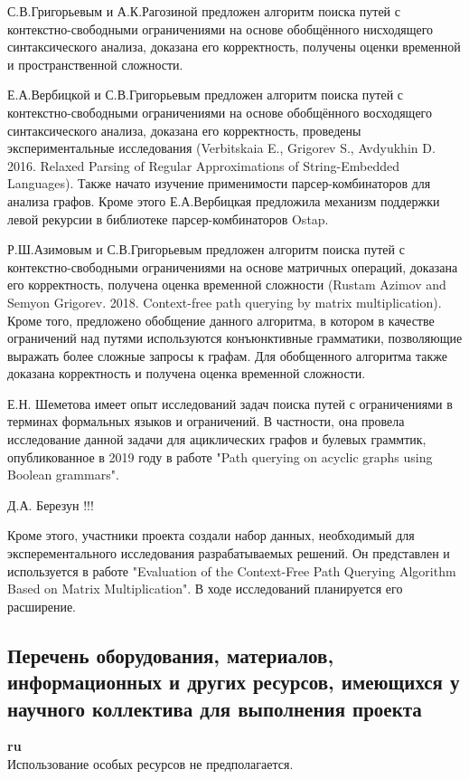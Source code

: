\documentclass[12pt]{article}  %
\theoremstyle{remark}
\begin{document}
С.В.Григорьевым и А.К.Рагозиной предложен алгоритм поиска путей с контекстно-свободными ограничениями на основе обобщённого нисходящего синтаксического анализа, доказана его корректность, получены оценки временной и пространственной сложности.

Е.А.Вербицкой и С.В.Григорьевым предложен алгоритм поиска путей с контекстно-свободными ограничениями на основе обобщённого восходящего синтаксического анализа, доказана его корректность, проведены экспериментальные исследования (Verbitskaia E., Grigorev S., Avdyukhin D. 2016. Relaxed Parsing of Regular Approximations of String-Embedded Languages). Также начато изучение применимости парсер-комбинаторов для анализа графов. Кроме этого Е.А.Вербицкая предложила механизм поддержки левой рекурсии в библиотеке парсер-комбинаторов Ostap.

Р.Ш.Азимовым и С.В.Григорьевым предложен алгоритм поиска путей с контекстно-свободными ограничениями на основе матричных операций, доказана его корректность, получена оценка временной сложности (Rustam Azimov and Semyon Grigorev. 2018. Context-free path querying by matrix multiplication). Кроме того, предложено обобщение данного алгоритма, в котором в качестве ограничений над путями используются конъюнктивные грамматики, позволяющие выражать более сложные запросы к графам. Для обобщенного алгоритма также доказана корректность и получена оценка временной сложности.

Е.Н. Шеметова имеет опыт исследований задач поиска путей с ограничениями в терминах формальных языков и ограничений. В частности, она провела исследование данной задачи для ациклических графов и булевых граммтик, опубликованное в 2019 году в работе "Path querying on acyclic graphs using Boolean grammars".

Д.А. Березун !!!

Кроме этого, участники проекта создали набор данных, необходимый для эксперементального исследования разрабатываемых решений. Он представлен и используется в работе "Evaluation of the Context-Free Path Querying Algorithm Based on Matrix Multiplication". В ходе исследований планируется его расширение.

\subsection{Перечень оборудования, материалов, информационных и других ресурсов, имеющихся у научного коллектива для выполнения проекта}
\textbf{ru}\\
%
Использование особых ресурсов не предполагается.
\end{document}
